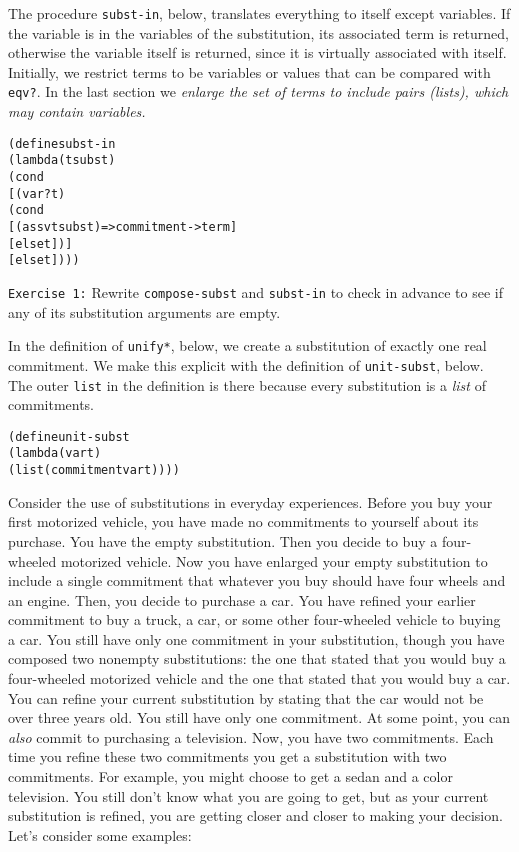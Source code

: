 The procedure \texttt{subst-in}, below, translates everything to
itself except variables.  If the variable is in the variables of the
substitution, its associated term is returned, otherwise the variable
itself is returned, since it is virtually associated with
itself. Initially, we restrict terms to be variables or values that
can be compared with \texttt{eqv?}.  In the last section we
\emph{enlarge the set of terms to include pairs (lists), which may
contain variables.}

\begin{alltt}
(define subst-in
  (lambda (t subst)
    (cond
      [(var? t)
       (cond
         [(assv t subst) => commitment->term]
         [else t])]
      [else t])))
\end{alltt}

\texttt{Exercise 1:} Rewrite \texttt{compose-subst} and
\texttt{subst-in} to check in advance to see if any of
its substitution arguments are empty.

In the definition of \texttt{unify*}, below, we create a
substitution of exactly one real commitment. We make this explicit
with the definition of \texttt{unit-subst}, below. The outer
\texttt{list} in the definition is there because every substitution is a
\emph{list} of commitments.  

\begin{alltt}
(define unit-subst 
  (lambda (var t)
    (list (commitment var t))))
\end{alltt}

Consider the use of substitutions in everyday experiences.  Before you
buy your first motorized vehicle, you have made no commitments to
yourself about its purchase.  You have the empty substitution.  Then
you decide to buy a four-wheeled motorized vehicle.  Now you have
enlarged your empty substitution to include a single commitment that
whatever you buy should have four wheels and an engine.  Then, you
decide to purchase a car.  You have refined your earlier commitment to
buy a truck, a car, or some other four-wheeled vehicle to buying a
car.  You still have only one commitment in your substitution, though
you have composed two nonempty substitutions: the one that stated that
you would buy a four-wheeled motorized vehicle and the one that stated
that you would buy a car.  You can refine your current substitution by
stating that the car would not be over three years old.  You still
have only one commitment.  At some point, you can \emph{also} commit
to purchasing a television.  Now, you have two commitments.  Each time
you refine these two commitments you get a substitution with two
commitments.  For example, you might choose to get a sedan and a color
television.  You still don't know what you are going to get, but as
your current substitution is refined, you are getting closer and
closer to making your decision.  Let's consider some examples:


